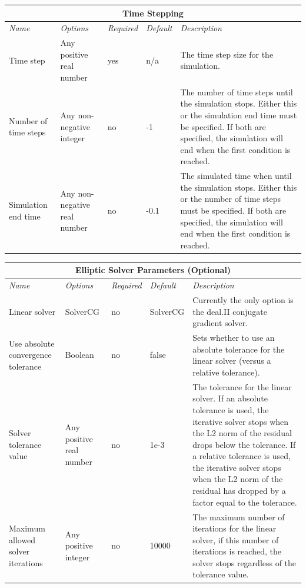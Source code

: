 \documentclass[10pt]{article} %
\begin{document}
\begin{center}
    \begin{tabular}{ | p{} | p{} | p{} | p{} | p{} |}
    \hline
      \multicolumn{5}{|c|}{\textbf{Time Stepping}} \\
    \hline
    \hline
    \emph{Name} & \emph{Options} & \emph{Required} & \emph{Default} & \emph{Description} \\ \hline
    Time step & Any positive real number & yes & n/a & The time step size for the simulation. \\ \hline
Number of time steps & Any non-negative integer & no & -1 & The number of time steps until the simulation stops. Either this or the simulation end time must be specified. If both are specified, the simulation will end when the first condition is reached. \\ \hline
      Simulation end time & Any non-negative real number & no & -0.1 & The simulated time when until the simulation stops. Either this or the number of time steps must be specified. If both are specified, the simulation will end when the first condition is reached.  \\ \hline
    \end{tabular}
\end{center}

\begin{center}
    \begin{tabular}{ | p{} | p{} | p{} | p{} | p{} |}
    \hline
      \multicolumn{5}{|c|}{\textbf{Elliptic Solver Parameters (Optional)}} \\
    \hline
    \hline
    \emph{Name} & \emph{Options} & \emph{Required} & \emph{Default} & \emph{Description} \\ \hline
    Linear solver & SolverCG & no & SolverCG & Currently the only option is the deal.II conjugate gradient solver. \\ \hline
     Use absolute convergence tolerance & Boolean & no & false & Sets whether to use an absolute tolerance for the linear solver (versus a relative tolerance). \\ \hline
Solver tolerance value & Any positive real number & no & 1e-3 & The tolerance for the linear solver. If an absolute tolerance is used, the iterative solver stops when the L2 norm of the residual drops below the tolerance. If a relative tolerance is used, the iterative solver stops when the L2 norm of the residual has dropped by a factor equal to the tolerance. \\ \hline
Maximum allowed solver iterations & Any positive integer & no & 10000 & The maximum number of iterations for the linear solver, if this number of iterations is reached, the solver stops regardless of the tolerance value. \\ \hline
    \end{tabular}
\end{center}
\end{document}
